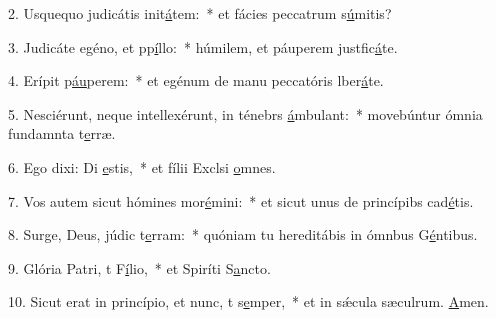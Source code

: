 2. Usquequo judicátis init\uline{á}tem:~* et fácies peccatrum s\uline{ú}mitis?\par 
3. Judicáte egéno, et pp\uline{í}llo:~* húmilem, et páuperem justfic\uline{á}te.\par 
4. Erípit p\uline{áu}perem:~* et egénum de manu peccatóris lber\uline{á}te.\par 
5. Nesciérunt, neque intellexérunt, in ténebrs \uline{á}mbulant:~* movebúntur ómnia fundamnta t\uline{e}rræ.\par 
6. Ego dixi: Di \uline{e}stis,~* et fílii Exclsi \uline{o}mnes.\par 
7. Vos autem sicut hómines mor\uline{é}mini:~* et sicut unus de princípibs cad\uline{é}tis.\par 
8. Surge, Deus, júdic t\uline{e}rram:~* quóniam tu hereditábis in ómnbus G\uline{é}ntibus.\par 
9. Glória Patri, t F\uline{í}lio,~* et Spiríti S\uline{a}ncto.\par 
10. Sicut erat in princípio, et nunc, t s\uline{e}mper,~* et in sǽcula sæculrum. \uline{A}men.\par 
